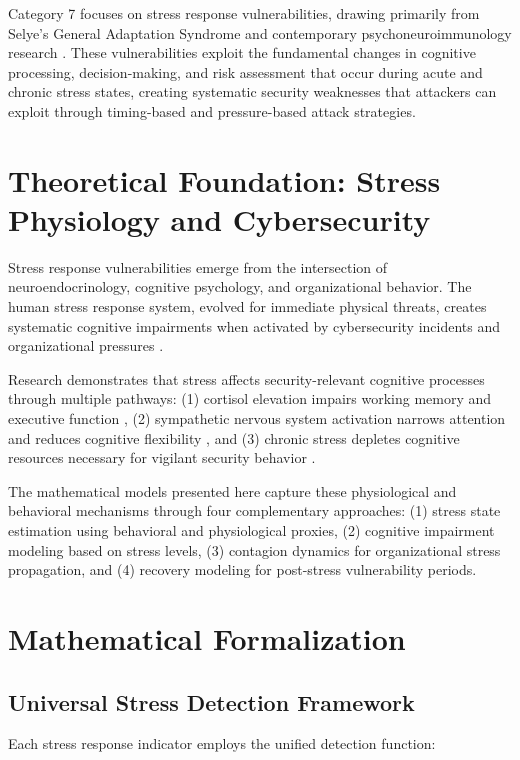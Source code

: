 \documentclass[11pt,a4paper]{article}
\begin{document}
Category 7 focuses on stress response vulnerabilities, drawing primarily from Selye's General Adaptation Syndrome \cite{selye1956} and contemporary psychoneuroimmunology research \cite{mcewen2007}. These vulnerabilities exploit the fundamental changes in cognitive processing, decision-making, and risk assessment that occur during acute and chronic stress states, creating systematic security weaknesses that attackers can exploit through timing-based and pressure-based attack strategies.

\section{Theoretical Foundation: Stress Physiology and Cybersecurity}

Stress response vulnerabilities emerge from the intersection of neuroendocrinology, cognitive psychology, and organizational behavior. The human stress response system, evolved for immediate physical threats, creates systematic cognitive impairments when activated by cybersecurity incidents and organizational pressures \cite{sapolsky2004}.

Research demonstrates that stress affects security-relevant cognitive processes through multiple pathways: (1) cortisol elevation impairs working memory and executive function \cite{lupien2009}, (2) sympathetic nervous system activation narrows attention and reduces cognitive flexibility \cite{easterbrook1959}, and (3) chronic stress depletes cognitive resources necessary for vigilant security behavior \cite{baumeister2007}.

The mathematical models presented here capture these physiological and behavioral mechanisms through four complementary approaches: (1) stress state estimation using behavioral and physiological proxies, (2) cognitive impairment modeling based on stress levels, (3) contagion dynamics for organizational stress propagation, and (4) recovery modeling for post-stress vulnerability periods.

\section{Mathematical Formalization}

\subsection{Universal Stress Detection Framework}

Each stress response indicator employs the unified detection function:
\end{document}
